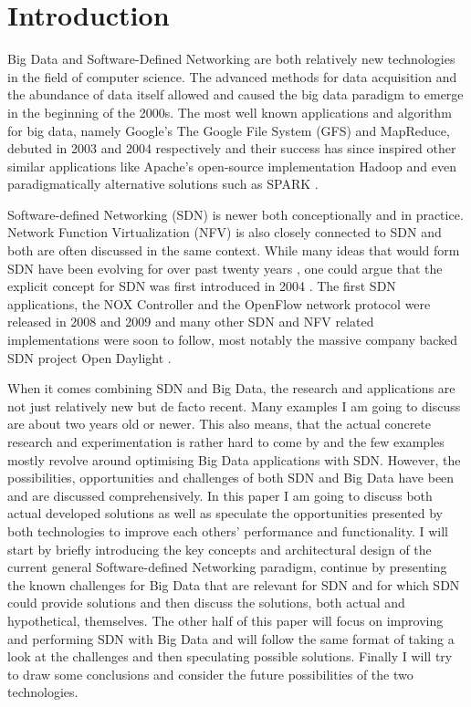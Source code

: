 \documentclass{acm_proc_article-sp}
\begin{document}


\section{Introduction}
Big Data and Software-Defined Networking are both relatively new technologies in the field of computer science. The advanced methods for data acquisition and the abundance of data itself allowed and caused the big data paradigm to emerge in the beginning of the 2000s. The most well known applications and algorithm for big data, namely Google's The Google File System (GFS) and MapReduce, debuted in 2003 and 2004 respectively \cite{Ghemawat:2003:GFS:1165389.945450,Dean:2008:MSD:1327452.1327492} and their success has since inspired other similar applications like Apache's open-source implementation Hadoop \cite{Hadoop} and even paradigmatically alternative solutions such as SPARK \cite{Spark}.

Software-defined Networking (SDN) is newer both conceptionally and in practice. Network Function Virtualization (NFV) is also closely connected to SDN and both are often discussed in the same context. While many ideas that would form SDN have been evolving for over past twenty years \cite{Feamster:2013:RS:2559899.2560327}, one could argue that the explicit concept for SDN was first introduced in 2004 \cite{robert2012system}. The first SDN applications, the NOX Controller \cite{NOX} and the OpenFlow network protocol \cite{McKeown-CCR2008}  were released in 2008 and 2009 and many other SDN and NFV related implementations were soon to follow, most notably the massive company backed SDN project Open Daylight \cite{ODL}.

When it comes combining SDN and Big Data, the research and applications are not just relatively new but de facto recent. Many examples I am going to discuss are about two years old or newer. This also means, that the actual concrete research and experimentation is rather hard to come by and the few examples mostly revolve around optimising Big Data applications with SDN. However, the possibilities, opportunities and challenges of both SDN and Big Data have been and are discussed comprehensively. In this paper I am going to discuss both actual developed solutions as well as speculate the opportunities presented by both technologies to improve each others' performance and functionality. I will start by briefly introducing the key concepts and architectural design of the current general Software-defined Networking paradigm, continue by presenting the known challenges for Big Data that are relevant for SDN and for which SDN could provide solutions and then discuss the solutions, both actual and hypothetical, themselves. The other half of this paper will focus on improving and performing SDN with Big Data and will follow the same format of taking a look at the challenges and then speculating possible solutions. Finally I will try to draw some conclusions and consider the future possibilities of the two technologies. 
\end{document}
